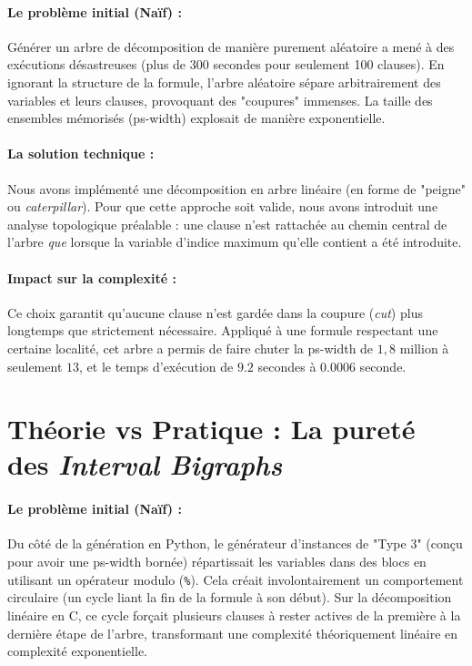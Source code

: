 \documentclass[11pt,a4paper]{report}
\begin{document}
\paragraph{Le problème initial (Naïf) :}
Générer un arbre de décomposition de manière purement aléatoire a mené à des exécutions désastreuses (plus de 300 secondes pour seulement 100 clauses). En ignorant la structure de la formule, l'arbre aléatoire sépare arbitrairement des variables et leurs clauses, provoquant des "coupures" immenses. La taille des ensembles mémorisés (ps-width) explosait de manière exponentielle.

\paragraph{La solution technique :}
Nous avons implémenté une décomposition en arbre linéaire (en forme de "peigne" ou \textit{caterpillar}). Pour que cette approche soit valide, nous avons introduit une analyse topologique préalable : une clause n'est rattachée au chemin central de l'arbre \textit{que} lorsque la variable d'indice maximum qu'elle contient a été introduite. 

\paragraph{Impact sur la complexité :}
Ce choix garantit qu'aucune clause n'est gardée dans la coupure (\textit{cut}) plus longtemps que strictement nécessaire. Appliqué à une formule respectant une certaine localité, cet arbre a permis de faire chuter la ps-width de $1,8$ million à seulement $13$, et le temps d'exécution de $9.2$ secondes à $0.0006$ seconde.

\section*{Théorie vs Pratique : La pureté des \textit{Interval Bigraphs}}

\paragraph{Le problème initial (Naïf) :}
Du côté de la génération en Python, le générateur d'instances de "Type 3" (conçu pour avoir une ps-width bornée) répartissait les variables dans des blocs en utilisant un opérateur modulo (\texttt{\%}). Cela créait involontairement un comportement circulaire (un cycle liant la fin de la formule à son début). Sur la décomposition linéaire en C, ce cycle forçait plusieurs clauses à rester actives de la première à la dernière étape de l'arbre, transformant une complexité théoriquement linéaire en complexité exponentielle.
\end{document}
